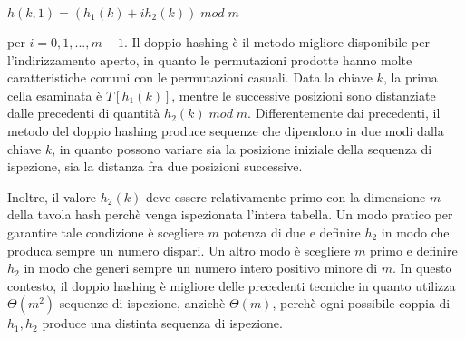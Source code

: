\(h(k,1) = (h_1(k)+ih_2(k))\;mod\;m\)

\noindent per \(i=0,1,...,m-1\). Il doppio hashing è il metodo migliore disponibile per l'indirizzamento aperto, in quanto le permutazioni prodotte hanno molte caratteristiche comuni con le permutazioni casuali. Data la chiave \(k\), la prima cella esaminata è \(T[h_1(k)]\), mentre le successive posizioni sono distanziate dalle precedenti di quantità \(h_2(k)\;mod\;m\). Differentemente dai precedenti, il metodo del doppio hashing produce sequenze che dipendono in due modi dalla chiave \(k\), in quanto possono variare sia la posizione iniziale della sequenza di ispezione, sia la distanza fra due posizioni successive. 

Inoltre, il valore \(h_2(k)\) deve essere relativamente primo con la dimensione \(m\) della tavola hash perchè venga ispezionata l'intera tabella. Un modo pratico per garantire tale condizione è scegliere \(m\) potenza di due e definire \(h_2\) in modo che produca sempre un numero dispari. Un altro modo è scegliere \(m\) primo e definire \(h_2\) in modo che generi sempre un numero intero positivo minore di \(m\). In questo contesto, il doppio hashing è migliore delle precedenti tecniche in quanto utilizza \(\Theta(m^2)\) sequenze di ispezione, anzichè \(\Theta(m)\), perchè ogni possibile coppia di \(h_1, h_2\) produce una distinta sequenza di ispezione.





